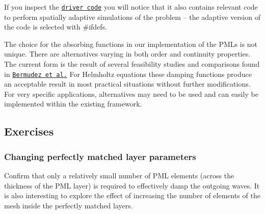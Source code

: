 \begin{DoxyItemize}
\item If you inspect the \href{../../../demo_drivers/pml_time_harmonic_linear_elasticity/time_harmonic_elasticity_driver.cc}{\tt driver code} you will notice that it also contains relevant code to perform spatially adaptive simulations of the problem -- the adaptive version of the code is selected with {\ttfamily \#ifdefs}.
\item The choice for the absorbing functions in our implementation of the P\+M\+Ls is not unique. There are alternatives varying in both order and continuity properties. The current form is the result of several feasibility studies and comparisons found in \href{http://www.sciencedirect.com/science/article/pii/S0021999106004487}{\tt Bermudez et al.} For Helmholtz equations these damping functions produce an acceptable result in most practical situations without further modifications. For very specific applications, alternatives may need to be used and can easily be implemented within the existing framework.
\end{DoxyItemize}



\hypertarget{index_ex}{}\subsection{Exercises}\label{index_ex}
\hypertarget{index_pmlsize}{}\subsubsection{Changing perfectly matched layer parameters}\label{index_pmlsize}
Confirm that only a relatively small number of P\+ML elements (across the thickness of the P\+ML layer) is required to effectively damp the outgoing waves. It is also interesting to explore the effect of increasing the number of elements of the mesh inside the perfectly matched layers.


